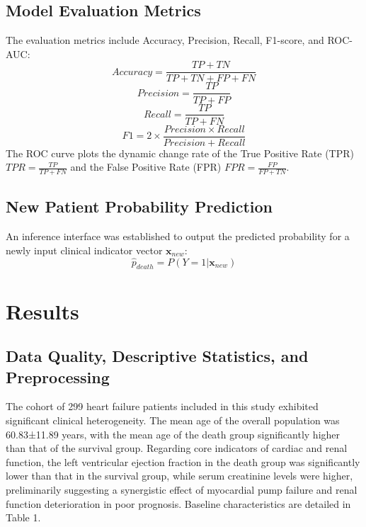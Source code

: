 \documentclass[12pt, a4paper]{article}
\begin{document}
\subsection{Model Evaluation Metrics}
The evaluation metrics include Accuracy, Precision, Recall, F1-score, and ROC-AUC:
\begin{equation}
Accuracy = \frac{TP + TN}{TP + TN + FP + FN}
\end{equation}
\begin{equation}
Precision = \frac{TP}{TP + FP}
\end{equation}
\begin{equation}
Recall = \frac{TP}{TP + FN}
\end{equation}
\begin{equation}
F1 = 2 \times \frac{Precision \times Recall}{Precision + Recall}
\end{equation}
The ROC curve plots the dynamic change rate of the True Positive Rate (TPR) $TPR = \frac{TP}{TP+FN}$ and the False Positive Rate (FPR) $FPR = \frac{FP}{FP+TN}$.

\subsection{New Patient Probability Prediction}
An inference interface was established to output the predicted probability for a newly input clinical indicator vector $\mathbf{x}_{new}$:
\begin{equation}
\hat{p}_{death} = P(Y=1|\mathbf{x}_{new})
\end{equation}

\section{Results}

\subsection{Data Quality, Descriptive Statistics, and Preprocessing}
The cohort of 299 heart failure patients included in this study exhibited significant clinical heterogeneity. The mean age of the overall population was 60.83±11.89 years, with the mean age of the death group significantly higher than that of the survival group. Regarding core indicators of cardiac and renal function, the left ventricular ejection fraction in the death group was significantly lower than that in the survival group, while serum creatinine levels were higher, preliminarily suggesting a synergistic effect of myocardial pump failure and renal function deterioration in poor prognosis. Baseline characteristics are detailed in Table 1.
\end{document}
